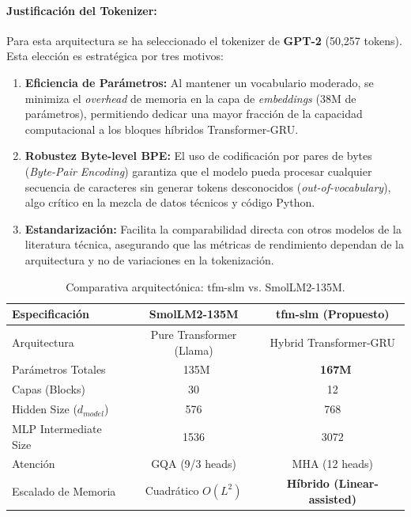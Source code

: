 \paragraph{Justificación del Tokenizer:} Para esta arquitectura se ha seleccionado el tokenizer de \textbf{GPT-2} (50,257 tokens). Esta elección es estratégica por tres motivos:
\begin{enumerate}
    \item \textbf{Eficiencia de Parámetros:} Al mantener un vocabulario moderado, se minimiza el \textit{overhead} de memoria en la capa de \textit{embeddings} (38M de parámetros), permitiendo dedicar una mayor fracción de la capacidad computacional a los bloques híbridos Transformer-GRU.
    \item \textbf{Robustez Byte-level BPE:} El uso de codificación por pares de bytes (\textit{Byte-Pair Encoding}) garantiza que el modelo pueda procesar cualquier secuencia de caracteres sin generar tokens desconocidos (\textit{out-of-vocabulary}), algo crítico en la mezcla de datos técnicos y código Python.
    \item \textbf{Estandarización:} Facilita la comparabilidad directa con otros modelos de la literatura técnica, asegurando que las métricas de rendimiento dependan de la arquitectura y no de variaciones en la tokenización.
\end{enumerate}

\begin{table}[H]
\centering
\begin{tabularx}{\textwidth}{|X|c|c|}
\hline
\textbf{Especificación} & \textbf{SmolLM2-135M} & \textbf{tfm-slm (Propuesto)} \\ \hline
Arquitectura & Pure Transformer (Llama) & Hybrid Transformer-GRU \\ \hline
Parámetros Totales & ~135M & \textbf{~167M} \\ \hline
Capas (Blocks) & 30 & 12 \\ \hline
Hidden Size ($d_{model}$) & 576 & 768 \\ \hline
MLP Intermediate Size & 1536 & 3072 \\ \hline
Atención & GQA (9/3 heads) & MHA (12 heads) \\ \hline
Escalado de Memoria & Cuadrático $O(L^2)$ & \textbf{Híbrido (Linear-assisted)} \\ \hline
\end{tabularx}
\caption{Comparativa arquitectónica: tfm-slm vs. SmolLM2-135M.}
\label{tab:comparativa_smollm}
\end{table}

